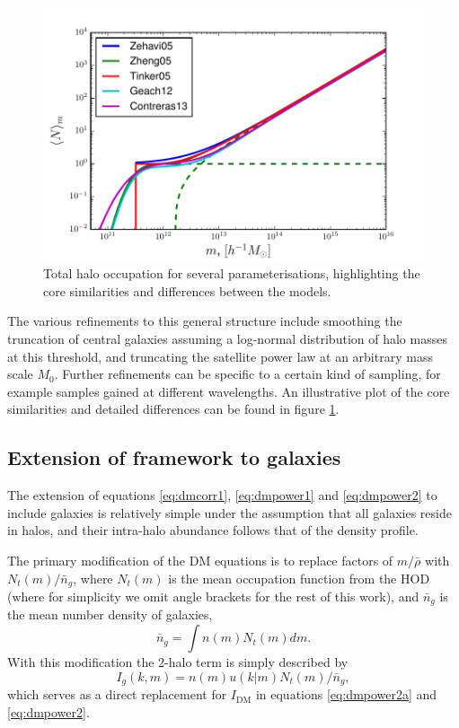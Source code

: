 \documentclass[5p]{elsarticle}
\begin{document}
\begin{figure}
\centering
\includegraphics[width=\linewidth]{figures/hod.pdf} 
\caption[Halo occupation for several parameterisations]{Total halo occupation for several parameterisations, highlighting the core similarities and differences between the models.}
\label{fig:hod}	
\end{figure}

The various refinements to this general structure include smoothing the truncation of central galaxies assuming a log-normal distribution of halo masses at this threshold, and truncating the satellite power law at an arbitrary mass scale $M_0$. Further refinements can be specific to a certain kind of sampling, for example samples gained at different wavelengths. An illustrative plot of the core similarities and detailed differences can be found in figure \ref{fig:hod}.



\subsection{Extension of framework to galaxies}
\label{sec:theory-gal:framework}
The extension of equations \ref{eq:dmcorr1}, \ref{eq:dmpower1} and \ref{eq:dmpower2} to include galaxies is relatively simple under the assumption that all galaxies reside in halos, and their intra-halo abundance follows that of the density profile. 

The primary modification of the DM equations is to replace factors of $m/\bar{\rho}$ with $N_t(m)/\bar{n}_g$, where $N_t(m)$ is the mean occupation function from the HOD (where for simplicity we omit angle brackets for the rest of this work), and $\bar{n}_g$ is the mean number density of galaxies,
\begin{equation}
    \label{eq:meandens}
 \bar{n}_g = \int n(m)N_t(m) dm.
\end{equation}
With this modification the 2-halo term is simply described by
\begin{equation}
    I_g(k,m) = n(m) u(k|m) N_t(m)/\bar{n}_g,
\end{equation}
which serves as a direct replacement for $I_\text{DM}$ in equations \ref{eq:dmpower2a} and \ref{eq:dmpower2}.
\end{document}
